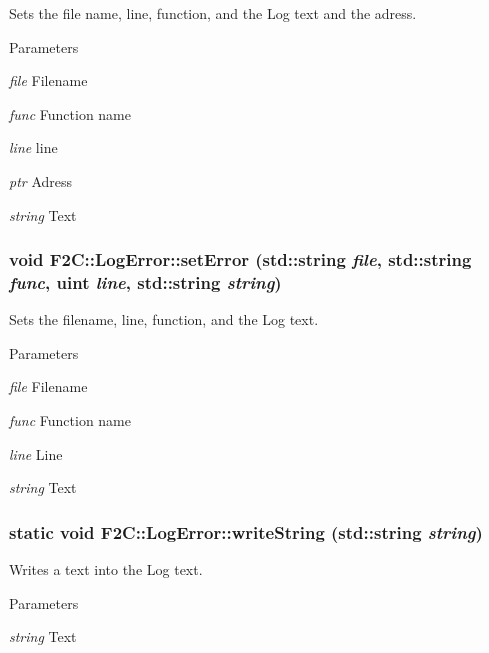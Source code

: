 Sets the file name, line, function, and the Log text and the adress. 
\begin{DoxyParams}{Parameters}
\item[{\em file}]Filename \item[{\em func}]Function name \item[{\em line}]line \item[{\em ptr}]Adress \item[{\em string}]Text \end{DoxyParams}
\hypertarget{class_f2_c_1_1_log_error_abce3f1efd9a5b93e1bd400f743ba398e}{
\subsubsection[{setError}]{\setlength{\rightskip}{0pt plus 5cm}void F2C::LogError::setError (std::string {\em file}, \/  std::string {\em func}, \/  {\bf uint} {\em line}, \/  std::string {\em string})}}
\label{class_f2_c_1_1_log_error_abce3f1efd9a5b93e1bd400f743ba398e}


Sets the filename, line, function, and the Log text. 
\begin{DoxyParams}{Parameters}
\item[{\em file}]Filename \item[{\em func}]Function name \item[{\em line}]Line \item[{\em string}]Text \end{DoxyParams}
\hypertarget{class_f2_c_1_1_log_error_a7821ec372e85a3d2c7095c4902525908}{
\subsubsection[{writeString}]{\setlength{\rightskip}{0pt plus 5cm}static void F2C::LogError::writeString (std::string {\em string})}}
\label{class_f2_c_1_1_log_error_a7821ec372e85a3d2c7095c4902525908}


Writes a text into the Log text. 
\begin{DoxyParams}{Parameters}
\item[{\em string}]Text \end{DoxyParams}


